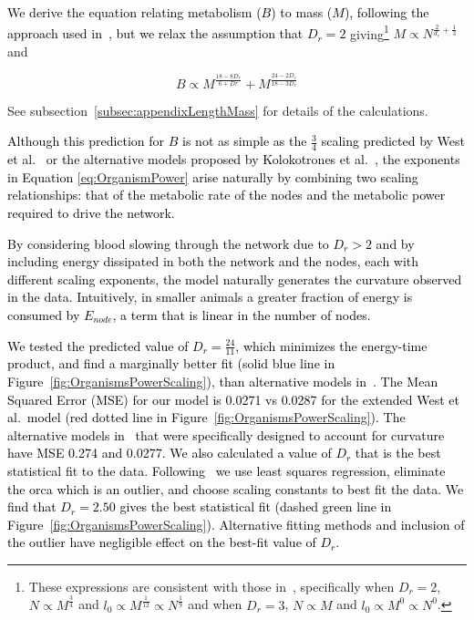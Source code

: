 \documentclass[12pt]{article}
\newcommand{\red}[1]{\textcolor{black}{#1}}
\begin{document}
\red{We derive the equation relating metabolism ($B$) to mass ($M$),
  following the approach used in~\cite{banavar10}, but
we relax the assumption that
$D_r=2$} giving\footnote{These expressions are consistent with those
in~\cite{banavar10}, specifically when $D_r=2$, $N\propto M^{\frac{3}{4}}$ and
$l_0 \propto M^{\frac{1}{12}}\propto N^{\frac{1}{9}}$ and when $D_r=3$, $N\propto M$ and $l_0\propto M^0 \propto N^0$.} $M \propto N^{\frac{2}{d_r} +
\frac{1}{3}}$ and

\begin{equation}
  \label{eq:OrganismPower}
  B \propto M^{\frac{18-8D_r}{6+Dr}} + M^{\frac{24-2D_r}{18-3D_r}} 
\end{equation}

\noindent See subsection~\ref{subsec:appendixLengthMass} for details of the calculations.

\red{Although this prediction for $B$ is not as simple as the $\frac{3}{4}$
scaling predicted by West et al.~\cite{west97} or the alternative models
proposed by Kolokotrones et al.~\cite{kolokotrones2010curvature}, the
exponents in Equation \ref{eq:OrganismPower} arise naturally by
combining two scaling relationships: that of the metabolic rate of the
nodes and the metabolic power required to drive the network.  }

\red{By considering blood slowing through the network due to $D_r > 2$ and by including energy dissipated in both
the network and the nodes, each with different scaling exponents, the model
naturally generates the curvature observed in the data.  Intuitively, in
smaller animals a greater fraction of energy is consumed by $E_{node}$, a term
that is linear in the number of nodes.  }

\red{We tested the predicted value of $D_r =
\frac{24}{11}$, which minimizes the energy-time product, and find a marginally better fit (solid blue line in Figure~\ref{fig:OrganismsPowerScaling}),  than alternative models in~\cite{kolokotrones2010curvature}.
The Mean Squared Error (MSE) for our model is 0.0271 vs 0.0287 for the extended West et al.\ model (red dotted line in Figure~\ref{fig:OrganismsPowerScaling}). The alternative models in~\cite{kolokotrones2010curvature} that were specifically designed to account for curvature have MSE 0.274 and 0.0277. We also calculated a value of $D_r$ that is the best statistical fit to the data. Following~\cite{kolokotrones2010curvature} we use least squares regression, eliminate the orca which is an outlier, and choose scaling constants to best fit the data. We find that $D_r = 2.50$ gives the best statistical fit (dashed green line in Figure~\ref{fig:OrganismsPowerScaling}). Alternative fitting methods and inclusion of the outlier have negligible effect on the best-fit value of $D_r$.}
\end{document}

